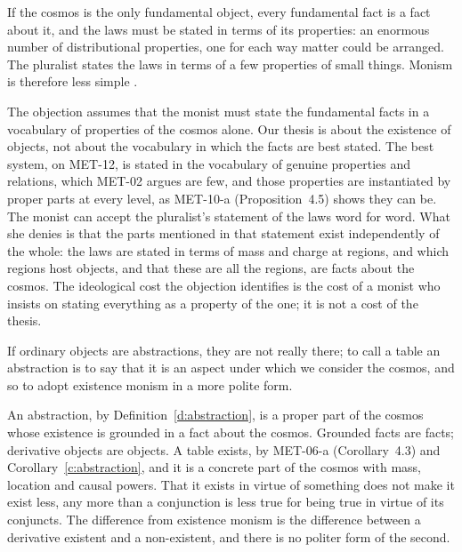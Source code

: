 \documentclass{situationist-preprint}
\begin{document}
\begin{objection}[Ideology]\label{o:ideology}
If the cosmos is the only fundamental object, every fundamental fact is a fact about it, and the laws must be stated in terms of its properties: an enormous number of distributional properties, one for each way matter could be arranged. The pluralist states the laws in terms of a few properties of small things. Monism is therefore less simple \citep{Sider2007}.
\end{objection}

\begin{reply}
The objection assumes that the monist must state the fundamental facts in a vocabulary of properties of the cosmos alone. Our thesis is about the existence of objects, not about the vocabulary in which the facts are best stated. The best system, on MET-12, is stated in the vocabulary of genuine properties and relations, which MET-02 argues are few, and those properties are instantiated by proper parts at every level, as MET-10-a (Proposition~4.5) shows they can be. The monist can accept the pluralist's statement of the laws word for word. What she denies is that the parts mentioned in that statement exist independently of the whole: the laws are stated in terms of mass and charge at regions, and which regions host objects, and that these are all the regions, are facts about the cosmos. The ideological cost the objection identifies is the cost of a monist who insists on stating everything as a property of the one; it is not a cost of the thesis.
\end{reply}

\begin{objection}\label{o:unreal}
If ordinary objects are abstractions, they are not really there; to call a table an abstraction is to say that it is an aspect under which we consider the cosmos, and so to adopt existence monism in a more polite form.
\end{objection}

\begin{reply}
An abstraction, by Definition~\ref{d:abstraction}, is a proper part of the cosmos whose existence is grounded in a fact about the cosmos. Grounded facts are facts; derivative objects are objects. A table exists, by MET-06-a (Corollary~4.3) and Corollary~\ref{c:abstraction}, and it is a concrete part of the cosmos with mass, location and causal powers. That it exists in virtue of something does not make it exist less, any more than a conjunction is less true for being true in virtue of its conjuncts. The difference from existence monism is the difference between a derivative existent and a non-existent, and there is no politer form of the second.
\end{reply}
\end{document}

